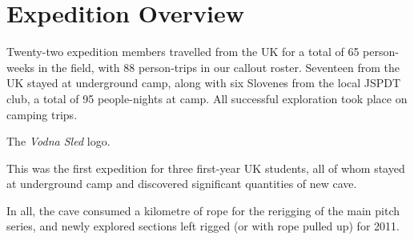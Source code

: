 \section{Expedition Overview}

Twenty-two expedition members travelled from the UK for a total of 65
person-weeks in the field, with 88 person-trips in our callout roster.
Seventeen from the UK stayed at underground camp, along with six
Slovenes from the local JSPDT club, a total of 95 people-nights at camp.
All successful exploration took place on camping trips.


    \begin{marginfigure}
\checkoddpage \ifoddpage \forcerectofloat \else \forceversofloat \fi
\centering
 \caption{The \textit{Vodna Sled} logo. }
 \label{zimmer gang 2010}
\end{marginfigure}

This was the first expedition for three first-year UK students, all of
whom stayed at underground camp and discovered significant quantities of
new cave.

In all, the cave consumed a kilometre of rope for the rerigging of the
main pitch series, and newly explored sections left rigged (or with rope
pulled up) for 2011.

